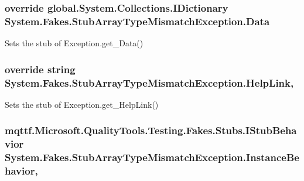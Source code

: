 \hypertarget{class_system_1_1_fakes_1_1_stub_array_type_mismatch_exception_a4a2c07fbf59b93fab857f1d9a39173d8}{
\subsubsection[{Data}]{\setlength{\rightskip}{0pt plus 5cm}override global.\-System.\-Collections.\-I\-Dictionary System.\-Fakes.\-Stub\-Array\-Type\-Mismatch\-Exception.\-Data\hspace{0.3cm}{\ttfamily [get]}}}\label{class_system_1_1_fakes_1_1_stub_array_type_mismatch_exception_a4a2c07fbf59b93fab857f1d9a39173d8}


Sets the stub of Exception.\-get\-\_\-\-Data()

\hypertarget{class_system_1_1_fakes_1_1_stub_array_type_mismatch_exception_a70e3328bd87f09f9bd10168c2316eeb1}{
\subsubsection[{Help\-Link}]{\setlength{\rightskip}{0pt plus 5cm}override string System.\-Fakes.\-Stub\-Array\-Type\-Mismatch\-Exception.\-Help\-Link\hspace{0.3cm}{\ttfamily [get]}, {\ttfamily [set]}}}\label{class_system_1_1_fakes_1_1_stub_array_type_mismatch_exception_a70e3328bd87f09f9bd10168c2316eeb1}


Sets the stub of Exception.\-get\-\_\-\-Help\-Link()

\hypertarget{class_system_1_1_fakes_1_1_stub_array_type_mismatch_exception_a787500394783bb1e2d6932030318377d}{
\subsubsection[{Instance\-Behavior}]{\setlength{\rightskip}{0pt plus 5cm}mqttf.\-Microsoft.\-Quality\-Tools.\-Testing.\-Fakes.\-Stubs.\-I\-Stub\-Behavior System.\-Fakes.\-Stub\-Array\-Type\-Mismatch\-Exception.\-Instance\-Behavior\hspace{0.3cm}{\ttfamily [get]}, {\ttfamily [set]}}}\label{class_system_1_1_fakes_1_1_stub_array_type_mismatch_exception_a787500394783bb1e2d6932030318377d}


